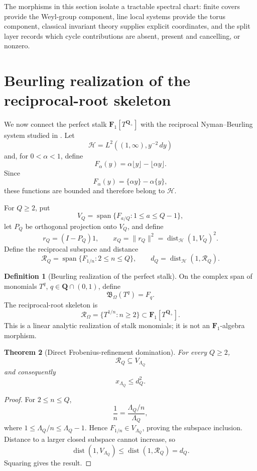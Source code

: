 \documentclass[11pt]{amsart}
\numberwithin{equation}{section}
\newtheorem{theorem}{Theorem}[section]
\theoremstyle{definition}
\newtheorem{definition}[theorem]{Definition}
\newcommand{\Q}{\mathbf Q}
\newcommand{\Fone}{\mathbf F_1}
\newcommand{\cH}{\mathcal H}
\newcommand{\cR}{\mathcal R}
\begin{document}
The morphisms in this section isolate a tractable spectral chart: finite
covers provide the Weyl-group component, line local systems provide the
torus component, classical invariant theory supplies explicit coordinates,
and the split layer records which cycle contributions are absent, present
and cancelling, or nonzero.

\section{Beurling realization of the reciprocal-root skeleton}
\label{sec:beurling-realization}

We now connect the perfect stalk $\Fone[T^{\Q_+}]$ with the reciprocal
Nyman--Beurling system studied in \cite{Schultze}.  Let
\[
\cH=L^2((1,\infty),y^{-2}\,dy)
\]
and, for $0<\alpha<1$, define
\[
F_\alpha(y)=\alpha\lfloor y\rfloor-\lfloor\alpha y\rfloor.
\]
Since
\[
F_\alpha(y)=\{\alpha y\}-\alpha\{y\},
\]
these functions are bounded and therefore belong to $\cH$.

For $Q\geq2$, put
\[
V_Q=\operatorname{span}\{F_{a/Q}:1\leq a\leq Q-1\},
\]
let $P_Q$ be orthogonal projection onto $V_Q$, and define
\[
r_Q=(I-P_Q)1,
\qquad
x_Q=\|r_Q\|^2
=\operatorname{dist}_{\cH}(1,V_Q)^2.
\]
Define the reciprocal subspace and distance
\[
\cR_Q=\operatorname{span}\{F_{1/n}:2\leq n\leq Q\},
\qquad
 d_Q=\operatorname{dist}_{\cH}(1,\cR_Q).
\]

\begin{definition}[Beurling realization of the perfect stalk]
\label{def:beurling-realization}
On the complex span of monomials $T^q$, $q\in\Q\cap(0,1)$, define
\[
\mathfrak B_\Omega(T^q)=F_q.
\]
The reciprocal-root skeleton is
\[
\mathscr R_\Omega=\{T^{1/n}:n\geq2\}
\subset\Fone[T^{\Q_+}].
\]
This is a linear analytic realization of stalk monomials; it is not an
$\Fone$-algebra morphism.
\end{definition}

\begin{theorem}[Direct Frobenius-refinement domination]
\label{thm:direct-beurling-domination}
For every $Q\geq2$,
\[
\cR_Q\subseteq V_{\Lambda_Q}
\]
and consequently
\[
\boxed{x_{\Lambda_Q}\leq d_Q^2.}
\]
\end{theorem}

\begin{proof}
For $2\leq n\leq Q$,
\[
\frac1n=\frac{\Lambda_Q/n}{\Lambda_Q},
\]
where $1\leq\Lambda_Q/n\leq\Lambda_Q-1$.  Hence
$F_{1/n}\in V_{\Lambda_Q}$, proving the subspace inclusion.  Distance to
a larger closed subspace cannot increase, so
\[
\operatorname{dist}(1,V_{\Lambda_Q})
\leq\operatorname{dist}(1,\cR_Q)=d_Q.
\]
Squaring gives the result.
\end{proof}
\end{document}
